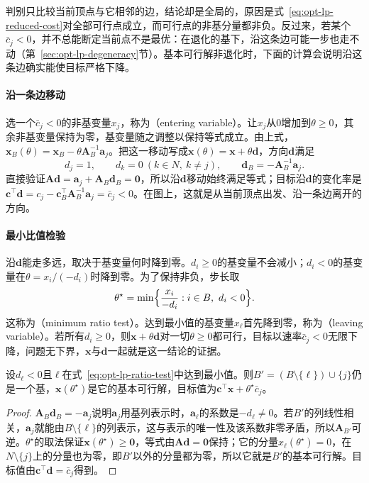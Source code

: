 判别只比较当前顶点与它相邻的边，结论却是全局的，原因是式~\eqref{eq:opt-lp-reduced-cost}对全部可行点成立，而可行点的非基分量都非负。反过来，若某个$\bar c_j<0$，并不总能断定当前点不是最优：在退化的基下，沿这条边可能一步也走不动（第~\ref{sec:opt-lp-degeneracy}节）。基本可行解非退化时，下面的计算会说明沿这条边确实能使目标严格下降。

\paragraph{沿一条边移动}
选一个$\bar c_j<0$的非基变量$x_j$，称为（entering variable）。让$x_j$从$0$增加到$\theta\ge0$，其余非基变量保持为零，基变量随之调整以保持等式成立。由上式，$\bm x_B(\theta)=\bm x_B-\theta\bm A_B^{-1}\bm a_j$。把这一移动写成$\bm x(\theta)=\bm x+\theta\bm d$，方向$\bm d$满足
\begin{equation}
\label{eq:opt-lp-direction}
  d_j=1,\qquad d_k=0\ (k\in N,\ k\ne j),\qquad \bm d_B=-\bm A_B^{-1}\bm a_j.
\end{equation}
直接验证$\bm A\bm d=\bm a_j+\bm A_B\bm d_B=\bm 0$，所以沿$\bm d$移动始终满足等式；目标沿$\bm d$的变化率是$\bm c^\top\bm d=c_j-\bm c_B^\top\bm A_B^{-1}\bm a_j=\bar c_j<0$。在图上，这就是从当前顶点出发、沿一条边离开的方向。

\paragraph{最小比值检验}
沿$\bm d$能走多远，取决于基变量何时降到零。$d_i\ge0$的基变量不会减小；$d_i<0$的基变量在$\theta=x_i/(-d_i)$时降到零。为了保持非负，步长取
\begin{equation}
\label{eq:opt-lp-ratio-test}
  \theta^\star=\min\Bigl\{\frac{x_i}{-d_i}:i\in B,\ d_i<0\Bigr\}.
\end{equation}
这称为（minimum ratio test）。达到最小值的基变量$x_\ell$首先降到零，称为（leaving variable）。若所有$d_i\ge0$，则$\bm x+\theta\bm d$对一切$\theta\ge0$都可行，目标以速率$\bar c_j<0$无限下降，问题无下界，$\bm x$与$\bm d$一起就是这一结论的证据。

\begin{lemma}[换基]
\label{lem:opt-lp-pivot}
设$d_\ell<0$且$\ell$在式~\eqref{eq:opt-lp-ratio-test}中达到最小值。则$B'=(B\setminus\{\ell\})\cup\{j\}$仍是一个基，$\bm x(\theta^\star)$是它的基本可行解，目标值为$\bm c^\top\bm x+\theta^\star\bar c_j$。
\end{lemma}

\begin{proof}
$\bm A_B\bm d_B=-\bm a_j$说明$\bm a_j$用基列表示时，$\bm a_\ell$的系数是$-d_\ell\ne0$。若$B'$的列线性相关，$\bm a_j$就能由$B\setminus\{\ell\}$的列表示，这与表示的唯一性及该系数非零矛盾，所以$\bm A_{B'}$可逆。$\theta^\star$的取法保证$\bm x(\theta^\star)\ge\bm 0$，等式由$\bm A\bm d=\bm 0$保持；它的分量$x_\ell(\theta^\star)=0$，在$N\setminus\{j\}$上的分量也为零，即$B'$以外的分量都为零，所以它就是$B'$的基本可行解。目标值由$\bm c^\top\bm d=\bar c_j$得到。
\end{proof}


